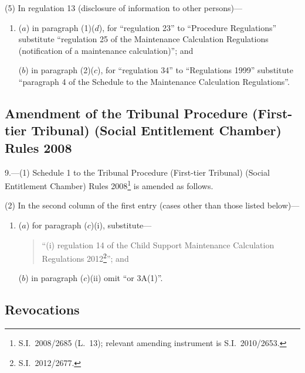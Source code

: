 \documentclass[12pt,a4paper]{article}
\begin{document}
(5) In regulation 13 (disclosure of information to other persons)—
\begin{enumerate}\item[]
($a$) in paragraph (1)($d$), for “regulation 23” to “Procedure Regulations” substitute “regulation 25 of the Maintenance Calculation Regulations (notification of a maintenance calculation)”; and

($b$) in paragraph (2)($c$), for “regulation 34” to “Regulations 1999” substitute “paragraph 4 of the Schedule to the Maintenance Calculation Regulations”.
\end{enumerate}

\subsection[9. Amendment of the Tribunal Procedure (First-tier Tribunal) (Social Entitlement Chamber) Rules 2008]{Amendment of the Tribunal Procedure (First-tier Tribunal) (Social Entitlement Chamber) Rules 2008}

9.---(1)  Schedule 1 to the Tribunal Procedure (First-tier Tribunal) (Social Entitlement Chamber) Rules 2008\footnote{S.I.~2008/2685 (L.~13); relevant amending instrument is S.I.~2010/2653.} is amended as follows.

(2) In the second column of the first entry (cases other than those listed below)—
\begin{enumerate}\item[]
($a$) for paragraph ($c$)(i), substitute—
\begin{quotation}
“(i) regulation 14 of the Child Support Maintenance Calculation Regulations 2012\footnote{S.I.~2012/2677.}”; and
\end{quotation}

($b$) in paragraph ($c$)(ii)  omit “or 3A(1)”.
\end{enumerate}

\subsection[10. Revocations]{Revocations}
\end{document}
